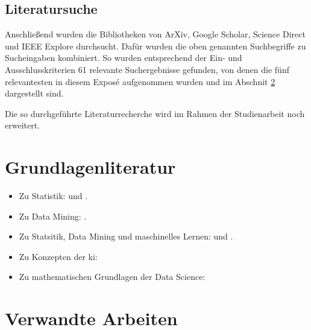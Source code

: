 \documentclass[lettersize,journal]{IEEEtran}
\begin{document}
\subsection{Literatursuche}
Anschließend wurden die Bibliotheken von ArXiv, Google Scholar, Science Direct und IEEE Explore durchsucht. Dafür wurden die oben genannten Suchbegriffe zu Sucheingaben kombiniert. So wurden entsprechend der Ein- und Ausschlusskriterien 61 relevante Suchergebnisse gefunden, von denen die fünf relevantesten in diesem Exposé aufgenommen wurden und im Abschnit \ref{sec:VerwandteArbeiten} dargestellt sind.

Die so durchgeführte Literaturrecherche wird im Rahmen der Studienarbeit noch erweitert.

\section{Grundlagenliteratur}
\begin{itemize}
  \item Zu Statistik:  und . 
  \item Zu Data Mining: . 
  \item Zu Statsitik, Data Mining und maschinelles Lernen:  und . 
  \item Zu Konzepten der \gls{ki}: 
  \item Zu mathematischen Grundlagen der Data Science: 
\end{itemize}


\section{Verwandte Arbeiten} \label{sec:VerwandteArbeiten}
\end{document}
